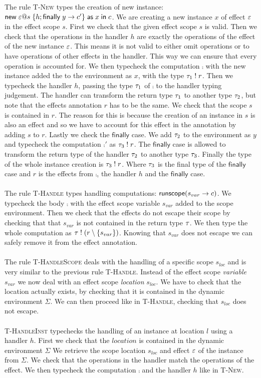 {The rule \textsc{T-New} types the creation of new instance: $\mathsf{new} \; \varepsilon @ s \; \{ h; \mathsf{finally} \; y \rightarrow c' \} \; \mathsf{as} \; x \;\mathsf{in}\; c$.
We are creating a new instance $x$ of effect $\varepsilon$ in the effect scope $s$.
First we check that the given effect scope $s$ is valid.
Then we check that the operations in the handler $h$ are exactly the operations of the effect of the new instance $\varepsilon$.
This means it is not valid to either omit operations or to have operations of other effects in the handler.
This way we can ensure that every operation is accounted for.
We then typecheck the computation $\comp$ with the new instance added the to the environment as $x$, with the type $\tau_1 \; ! \; r$.
Then we typecheck the handler $h$, passing the type $\tau_1$ of $\comp$ to the handler typing judgement.
The handler can transform the return type $\tau_1$ to another type $\tau_2$, but note that the effects annotation $r$ has to be the same.
We check that the scope $s$ is contained in $r$.
The reason for this is because the creation of an instance in $s$ is also an effect and so we have to account for this effect in the annotation by adding $s$ to $r$.
Lastly we check the $\mathsf{finally}$ case.
We add $\tau_2$ to the environment as $y$ and typecheck the computation $\comp'$ as $\tau_3 \; ! \; r$.
The $\mathsf{finally}$ case is allowed to transform the return type of the handler $\tau_2$ to another type $\tau_3$.
Finally the type of the whole instance creation is $\tau_3 \; ! \; r$.
Where $\tau_3$ is the final type of the $\mathsf{finally}$ case and $r$ is the effects from $\comp$, the handler $h$ and the $\mathsf{finally}$ case.
\\\\
The rule \textsc{T-Handle} types handling computations: $\mathsf{runscope} ( s_{var} \rightarrow c )$.
We typecheck the body $\comp$ with the effect scope variable $s_{var}$ added to the scope environment.
Then we check that the effects do not escape their scope by checking that that $s_{var}$ is not contained in the return type $\tau$.
We then type the whole computation as $\tau \; ! \; (r \setminus \{ s_{var} \})$.
Knowing that $s_{var}$ does not escape we can safely remove it from the effect annotation.
\\\\
The rule \textsc{T-HandleScope} deals with the handling of a specific scope $s_{loc}$ and is very similar to the previous rule \textsc{T-Handle}.
Instead of the effect scope \emph{variable} $s_{var}$ we now deal with an effect scope \emph{location} $s_{loc}$.
We have to check that the location actually exists, by checking that it is contained in the dynamic environment $\Sigma$.
We can then proceed like in \textsc{T-Handle}, checking that $s_{loc}$ does not escape.
\\\\
\textsc{T-HandleInst} typechecks the handling of an instance at location $l$ using a handler $h$.
First we check that the $location$ is contained in the dynamic environment $\Sigma$
We retrieve the scope location $s_{loc}$ and effect $\varepsilon$ of the instance from $\Sigma$.
We check that the operations in the handler match the operations of the effect.
We then typecheck the computation $\comp$ and the handler $h$ like in \textsc{T-New}.

}
